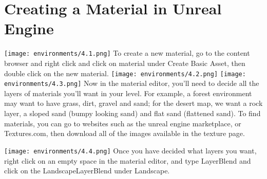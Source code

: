 \documentclass[../main.tex]{subfiles}
\begin{document}
\section {Creating a Material in Unreal Engine}
\texttt{[image: environments/4.1.png]}
To create a new material, go to the content browser and right click and click on material under Create Basic Asset, then double click on the new material.
\texttt{[image: environments/4.2.png]}
\texttt{[image: environments/4.3.png]}
Now in the material editor, you’ll need to decide all the layers of materials you’ll want in your level. For example, a forest environment may want to have grass, dirt, gravel and sand; for the desert map, we want a rock layer, a sloped sand (bumpy looking sand) and flat sand (flattened sand).
To find materials, you can go to websites such as the unreal engine marketplace, or Textures.com, then download all of the images available in the texture page.

\texttt{[image: environments/4.4.png]}
Once you have decided what layers you want, right click on an empty space in the material editor, and type LayerBlend and click on the LandscapeLayerBlend under Landscape.
\end{document}
